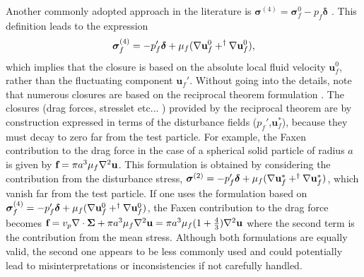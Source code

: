 Another commonly adopted approach in the literature is $\bm \sigma ^{(4)} = \bm \sigma _f ^0 - p_f\bm\delta$ \citep{simonin1996,lhuillier2009rheology,morel2015mathematical,guazzelli2018rheology}.
This definition leads to the expression
\begin{equation}
    \bm\sigma_f^{(4)}  = -p_f' \bm\delta + \mu_f (\mathbf{\nabla} \textbf{u}_f^0 + ^\dagger \mathbf{\nabla} \textbf{u}_f^0),
\end{equation}
which implies that the closure is based on the absolute local fluid velocity $\textbf{u}_f^0$, rather than the fluctuating component $\textbf{u}_f'$.
Without going into the details, note that numerous closures are based on the reciprocal theorem formulation \citep{kim2013microhydrodynamics,stone2001inertial,raja2010inertial}. %
The closures (drag forces, stresslet etc... ) provided by the reciprocal theorem are by construction expressed in terms of the disturbance fields ($p_f'$,$\textbf{u}^*_f$), because they must decay to zero far from the test particle. 
For example, the Faxen contribution to the drag force in the case of a spherical solid particle of radius $a$ is given by $\textbf{f} = \pi a^3 \mu_f \mathbf{\nabla}^2 \textbf{u}$. 
This formulation is obtained  by considering the contribution from the disturbance stress, $\bm\sigma ^{(2)}  = -p_f' \bm\delta + \mu_f (\mathbf{\nabla} \textbf{u}_f^* + ^\dagger \mathbf{\nabla} \textbf{u}_f^*)$, which vanish far from the test particle. 
If one uses the formulation based on $\bm\sigma_f^{(4)}  = -p_f' \bm\delta + \mu_f (\mathbf{\nabla} \textbf{u}_f^0 + ^\dagger \mathbf{\nabla} \textbf{u}_f^0)$, the Faxen contribution to the drag force becomes $\textbf{f} = v_p \mathbf{\nabla}\cdot \bm\Sigma + \pi a^3 \mu_f \mathbf{\nabla}^2 \textbf{u} = \pi a^3 \mu_f (1+ \frac{4}{3}) \mathbf{\nabla}^2 \textbf{u}$ where the second term is the contribution from the mean stress.
Although both formulations are equally valid, the second one appears to be less commonly used and could potentially lead to misinterpretations or inconsistencies if not carefully handled. 



